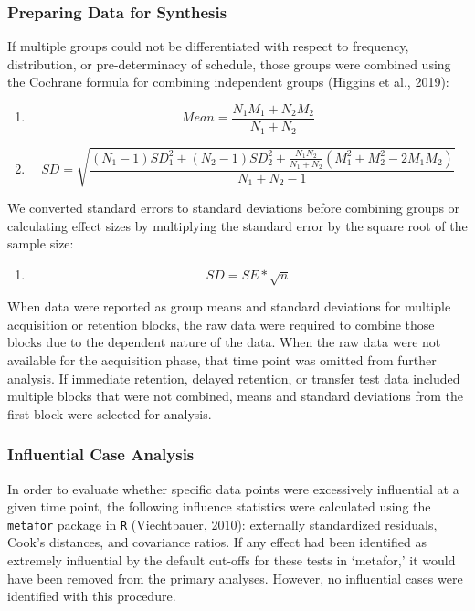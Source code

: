 \documentclass[
  english,
  man, donotrepeattitle,mask,floatsintext]{apa7}
\providecommand{\tightlist}{%
  \setlength{\itemsep}{0pt}\setlength{\parskip}{0pt}}
\begin{document}
\hypertarget{preparing-data-for-synthesis}{%
\subsubsection{Preparing Data for Synthesis}\label{preparing-data-for-synthesis}}

If multiple groups could not be differentiated with respect to frequency, distribution, or pre-determinacy of schedule, those groups were combined using the Cochrane formula for combining independent groups (Higgins et al., 2019):

\begin{enumerate}
\def\labelenumi{(\arabic{enumi})}
\item
  \[ Mean = \frac{N_1M_1 + N_2M_2}{N_1 + N_2} \]
\item
  \[ SD = \sqrt{\frac{(N_1 - 1)SD_1^2 + (N_2 - 1)SD_2^2 + \frac{N_1N_2}{N_1 + N_2}(M_1^2 + M_2^2 - 2M_1M_2)}{N_1 + N_2 - 1}} \]
\end{enumerate}

We converted standard errors to standard deviations before combining groups or calculating effect sizes by multiplying the standard error by the square root of the sample size:

\begin{enumerate}
\def\labelenumi{(\arabic{enumi})}
\setcounter{enumi}{2}
\tightlist
\item
  \[SD  = SE*\sqrt{n}\]
\end{enumerate}

When data were reported as group means and standard deviations for multiple acquisition or retention blocks, the raw data were required to combine those blocks due to the dependent nature of the data. When the raw data were not available for the acquisition phase, that time point was omitted from further analysis. If immediate retention, delayed retention, or transfer test data included multiple blocks that were not combined, means and standard deviations from the first block were selected for analysis.

\hypertarget{influential-case-analysis}{%
\subsubsection{Influential Case Analysis}\label{influential-case-analysis}}

In order to evaluate whether specific data points were excessively influential at a given time point, the following influence statistics were calculated using the \texttt{metafor} package in \texttt{R} (Viechtbauer, 2010): externally standardized residuals, Cook's distances, and covariance ratios. If any effect had been identified as extremely influential by the default cut-offs for these tests in `metafor,' it would have been removed from the primary analyses. However, no influential cases were identified with this procedure.
\end{document}
